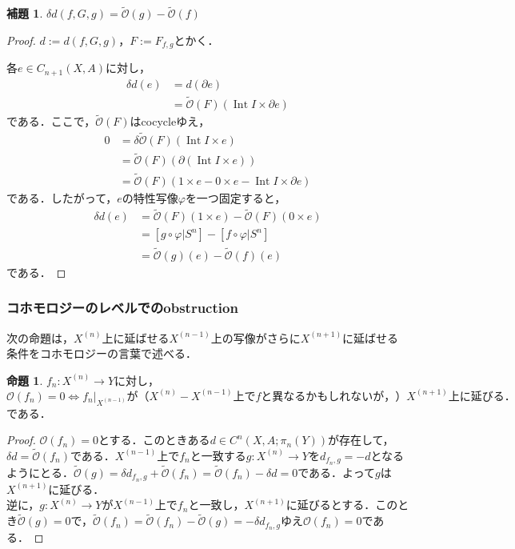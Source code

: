 \documentclass[a4paper,11pt]{jsarticle}
\theoremstyle{definition}
\newtheorem{prop}[thm]{命題}
\newtheorem{lem}[thm]{補題}
\DeclareMathOperator{\Int}{\mathrm{Int}}
\begin{document}
\begin{lem}
  $\delta d(f,G,g)=\tilde{\mathcal{O}}(g)-\tilde{\mathcal{O}}(f)$
\end{lem}
\begin{proof}
$d:=d(f,G,g)$，$F:=F_{f,g}$とかく．

  各$e\in C_{n+1}(X,A)$に対し，\begin{align*}
    \delta d(e)&=d(\partial e)\\
    &=\tilde{\mathcal{O}}(F)(\Int I\times \partial e)
  \end{align*}
  である．ここで，$\tilde{\mathcal{O}}(F)$はcocycleゆえ，\begin{align*}
    0&=\delta\tilde{\mathcal{O}}(F)(\Int I\times e)\\
    &=\tilde{\mathcal{O}}(F)(\partial(\Int I\times e))\\
    &=\tilde{\mathcal{O}}(F)(1\times e-0\times e-\Int I\times \partial e)
  \end{align*}である．したがって，$e$の特性写像$\varphi$を一つ固定すると，\begin{align*}
    \delta d(e)&=\tilde{\mathcal{O}}(F)(1\times e)-\tilde{\mathcal{O}}(F)(0\times e)\\
    &=[g\circ\varphi|{S^n}]-[f\circ\varphi|{S^n}]\\
    &=\tilde{\mathcal{O}}(g)(e)-\tilde{\mathcal{O}}(f)(e)
  \end{align*}である．
\end{proof}

\subsubsection{コホモロジーのレベルでのobstruction}
次の命題は，$X^{(n)}$上に延ばせる$X^{(n-1)}$上の写像がさらに$X^{(n+1)}$に延ばせる条件をコホモロジーの言葉で述べる．
\begin{prop}
  $f_n\colon X^{(n)}\to Y$に対し，\[
    \mathcal{O}(f_n)=0\Leftrightarrow f_n|_{X^{(n-1)}}が（X^{(n)}-X^{(n-1)}上でfと異なるかもしれないが，）X^{(n+1)}上に延びる．
  \]である．
\end{prop}
\begin{proof}
  $\mathcal{O}(f_n)=0$とする．このときある$d\in C^{n}(X,A;\pi_{n}(Y))$が存在して，$\delta d=\tilde{\mathcal{O}}(f_n)$である．$X^{(n-1)}$上で$f_n$と一致する$g\colon X^{(n)}\to Y$を$d_{f_n,g}=-d$となるようにとる．$\tilde{\mathcal{O}}(g)=\delta d_{f_n,g}+\tilde{\mathcal{O}}(f_n)=\tilde{\mathcal{O}}(f_n)-\delta d=0$である．よって$g$は$X^{(n+1)}$に延びる．\\

  逆に，$g\colon X^{(n)}\to Y$が$X^{(n-1)}$上で$f_n$と一致し，$X^{(n+1)}$に延びるとする．このとき$\tilde{\mathcal{O}}(g)=0$で，$\tilde{\mathcal{O}}(f_n)=\tilde{\mathcal{O}}(f_n)-\tilde{\mathcal{O}}(g)=-\delta d_{f_n,g}$ゆえ$\mathcal{O}(f_n)=0$である．
\end{proof}
\end{document}
